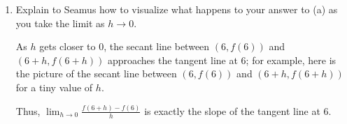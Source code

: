 \documentclass{article}
\theoremstyle{theorem}
\begin{document}
\begin{enumerate}
\begin{enumerate}
  \item
    \begin{problem}[\vfill\newpage]
      Explain to Seamus how to visualize what happens to your answer to (a) as you take the limit as $h \to 0$.
    \end{problem}

    \begin{solution}
      As $h$ gets closer to 0, the secant line between $(6, f(6))$ and
      $(6 + h, f(6 + h))$ approaches the tangent line at $6$; for
      example, here is the picture of the secant line between $(6, 
      f(6))$ and $(6 + h, f(6 + h))$ for a tiny value of $h$. 
      \begin{center}
      \end{center}
      Thus, $\displaystyle \lim_{h \to 0} \frac{f(6 + h) - f(6)}{h}$ is
      exactly the slope of the tangent line at $6$. 
    \end{solution}
  \end{enumerate}

\end{enumerate}
\end{document}
